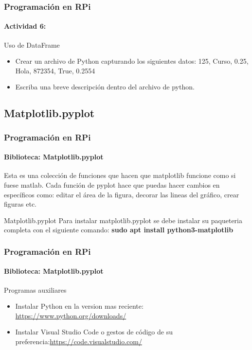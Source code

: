\documentclass{beamer}
\begin{document}
	\begin{frame}
		\frametitle{Programación en RPi}
	\framesubtitle{Actividad 6:}
	\begin{mybox}{Uso de DataFrame}
		\begin{itemize}
			\item Crear un archivo de Python capturando los siguientes datos: 125, Curso, 0.25, Hola, 872354, True, 0.2554
			\item Escriba una breve descripción dentro del archivo de python.
		\end{itemize}
	\end{mybox}	
	\end{frame}
	\subsection{Matplotlib.pyplot}
	\begin{frame}
		\frametitle{Programación en RPi}
		\framesubtitle{Biblioteca: Matplotlib.pyplot}
		Esta es una colección de funciones que hacen que matplotlib funcione como si fuese matlab. Cada función de pyplot hace que puedas hacer cambios en específicos como: editar el área de la figura, decorar las lineas del gráfico, crear figuras etc.
		\begin{mybox}{Matplotlib.pyplot}
			Para instalar matplotlib.pyplot se debe instalar su paqueteria completa con el siguiente comando: \textbf{sudo apt install python3-matplotlib}
		\end{mybox}
	\end{frame}
	\begin{frame}
		\frametitle{Programación en RPi}
		\framesubtitle{Biblioteca: Matplotlib.pyplot}
		\begin{mybox}{Programas auxiliares}
			\begin{itemize}
				\item Instalar Python en la version mas reciente: \url{https://www.python.org/downloads/}
				\item Instalar Visual Studio Code o gestos de código de su preferencia:\url{https://code.visualstudio.com/} 
			\end{itemize}
		\end{mybox}
	\end{frame}
	
\end{document}
